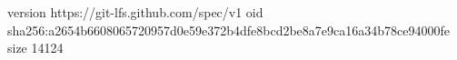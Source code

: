 version https://git-lfs.github.com/spec/v1
oid sha256:a2654b6608065720957d0e59e372b4dfe8bcd2be8a7e9ca16a34b78ce94000fe
size 14124
